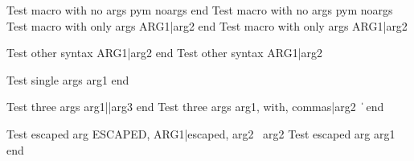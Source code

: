 \documentclass{article}
\author{Macro Arg Test}
\begin{document}
	Test macro with no args pym noargs \test end
	Test macro with no args pym noargs \test\other
	Test macro with only args ARG1|arg2 end
	Test macro with only args ARG1|arg2\other

	Test other syntax ARG1|arg2 end
	Test other syntax ARG1|arg2\other

	Test single args arg1 end

	Test three args arg1||arg3 end
	Test three args arg1, with, commas|arg2 \ \| end

	Test escaped arg {ESCAPED, ARG1}|{escaped, arg2 \ arg2}
	Test escaped arg {arg1} end
\end{document}
